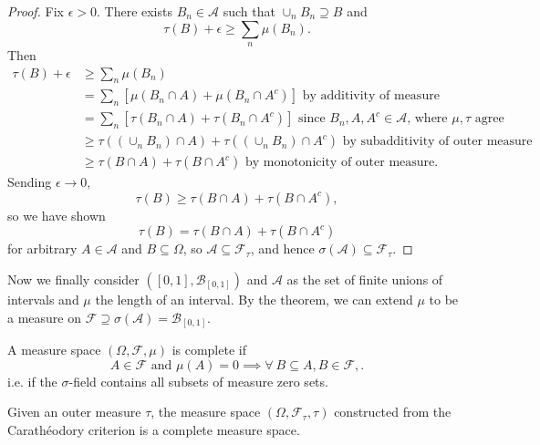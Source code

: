 \begin{proof}
	Fix $\epsilon > 0$. There exists $B_n \in \mathscr{A}$ such that $\cup_n B_n \supseteq B$ and \[
		\tau(B) + \epsilon \ge \sum_n \mu(B_n)
	.\] 
		Then
	\begin{align*}
		\tau(B) + \epsilon &\ge \sum\limits_{n}^{} \mu(B_n) \\
				&= \sum_n \left[ \mu(B_n \cap A) + \mu(B_n \cap A^{c}) \right] \text{ by additivity of measure} \\
						   &= \sum_n \left[ \tau(B_n \cap A) + \tau(B_n \cap A^{c}) \right]  \text{ since $B_n, A, A^{c} \in \mathscr{A}$, where $\mu,\tau$ agree} \\
						   &\ge \tau\left( \left( \cup_n B_n \right)\cap A \right) + \tau\left( \left( \cup_n B_n\right)\cap A^{c} \right) \text{ by subadditivity of outer measure} \\
						   &\ge \tau\left( B\cap A \right) + \tau(B \cap A^{c}) \text{ by monotonicity of outer measure}
	.\end{align*}
	Sending $\epsilon \to 0$, \[
		\tau(B) \ge \tau(B \cap A) + \tau\left( B \cap A^{c} \right)
	,\] so we have shown \[
		\tau(B) = \tau(B \cap A) + \tau(B \cap A^{c})
	\] for arbitrary $A \in \mathscr{A}$ and $B \subseteq \Omega$, so $\mathscr{A} \subseteq \mathscr{F}_\tau$, and hence $\sigma(\mathscr{A}) \subseteq \mathscr{F}_\tau$.
\end{proof}

Now we finally consider $\left( [0,1], \mathscr{B}_{[0,1]} \right)$ and $\mathscr{A}$ as the set of finite unions of intervals and $\mu$ the length of an interval. By the theorem, we can extend $\mu$ to be a measure on $\mathscr{F} \supseteq \sigma(\mathscr{A}) = \mathscr{B}_{[0,1]}$.

\begin{definition}
	A measure space $(\Omega, \mathscr{F},\mu)$ is complete if \[
		A \in \mathscr{F} \text{ and } \mu(A) = 0 \implies \forall\ B \subseteq A, B \in \mathscr{F},
	.\] i.e. if the $\sigma$-field contains all subsets of measure zero sets.
\end{definition}

\begin{theorem}
	Given an outer measure $\tau$, the measure space $(\Omega, \mathscr{F}_\tau, \tau)$ constructed from the Carath\'eodory criterion is a complete measure space.
\end{theorem}

